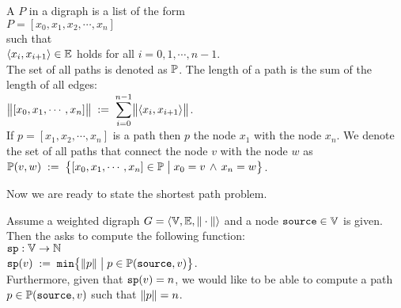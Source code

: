 \begin{Definition}
 A  $P$ in a digraph is a list of the form 
\\[0.2cm]
\hspace*{1.3cm} 
$P = [ x_0, x_1, x_2, \cdots, x_n ]$ 
\\[0.2cm]
such that
\\[0.2cm]
\hspace*{1.3cm} $\pair(x_i,x_{i+1}) \in \edges$ \quad holds for all $i = 0, 1, \cdots, n-1$. 
\\[0.2cm]
The set of all paths is denoted as ${\mathbb P}$.
The length of a path is the sum of the length of all edges:
\\[0.2cm]
\hspace*{1.3cm}
$\ds\Weight{[x_0,x_1, \cdots, x_n]} \df \sum\limits_{i=0}^{n-1} \Weight{\pair(x_i,x_{i+1})}$. 
\\[0.2cm]
If  $p = [x_1, x_2, \cdots, x_n]$ is a path then  $p$  the node $x_1$ with the node
$x_n$.  We denote the set of all paths that connect the node $v$ with the node $w$ as
\\[0.2cm]
\hspace*{1.3cm} 
 ${\mathbb P}(v,w) \;:=\; \bigl\{ [x_0, x_1, \cdots, x_n] \in {\mathbb P} \bigm| x_0 = v \,\wedge\, x_n = w \bigr\}$.
\end{Definition}

\noindent
Now we are ready to state the shortest path problem.

\begin{Definition} \lb
  Assume a weighted digraph  
  $G = \langle {\mathbb V}, {\mathbb E}, \|\cdot\| \rangle$ 
  and a node $\mbox{\tt source} \in {\mathbb V}$ is given.  Then the  asks to compute
  the following function:
  \\[0.2cm]
  \hspace*{1.3cm} $\mathtt{sp}: {\mathbb V} \rightarrow {\mathbb N}$ \\[0.1cm]
  \hspace*{1.3cm} $\mathtt{sp}(v) \;:=\; \texttt{min}\bigl\{ \|p\| \bigm| p \in {\mathbb P}(\mbox{\tt source},v) \bigr\}$.
  \\[0.2cm]
  Furthermore, given that $\mathtt{sp}(v) = n$, we would like to be able to compute a path 
  $p \in {\mathbb P}(\mbox{\tt source},v)$ such that $\|p\| = n$.
  \eox
\end{Definition}

